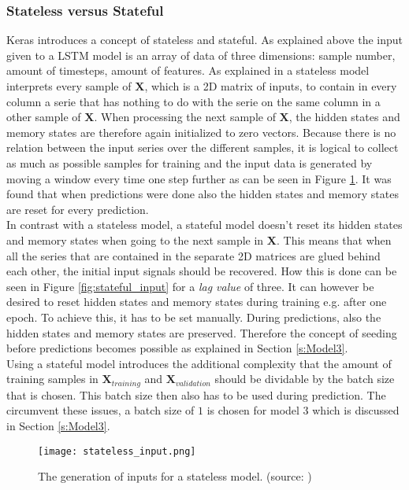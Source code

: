 \subsubsection{Stateless versus Stateful}
Keras introduces a concept of stateless and stateful. As explained above the input given to a LSTM model is an array of data of three dimensions: sample number, amount of timesteps, amount of features. As explained in \cite{FneishMo} a stateless model interprets every sample of $ \bm{X} $, which is a 2D matrix of inputs, to contain in every column a serie that has nothing to do with the serie on the same column in a other sample of $ \bm{X} $. When processing the next sample of $ \bm{X} $, the hidden states and memory states are therefore again initialized to zero vectors. Because there is no relation between the input series over the different samples, it is logical to collect as much as possible samples for training and the input data is generated by moving a window every time one step further as can be seen in Figure \ref{fig:stateless_input}. It was found that when predictions were done also the hidden states and memory states are reset for every prediction.\\

In contrast with a stateless model, a stateful model doesn't reset its hidden states and memory states when going to the next sample in $ \bm{X} $. This means that when all the series that are contained in the separate 2D matrices are glued behind each other, the initial input signals should be recovered. How this is done can be seen in Figure \ref{fig:stateful_input} for a \textit{lag value} of three. It can however be desired to reset hidden states and memory states during training e.g. after one epoch. To achieve this, it has to be set manually. During predictions, also the hidden states and memory states are preserved. Therefore the concept of seeding before predictions becomes possible as explained in Section \ref{s:Model3}.\\

Using a stateful model introduces the additional complexity that the amount of training samples in $ \bm{X}_{training} $ and $ \bm{X}_{validation} $ should be dividable by the batch size that is chosen. This batch size then also has to be used during prediction. The circumvent these issues, a batch size of $ 1 $ is chosen for model $ 3 $ which is discussed in Section \ref{s:Model3}.\\


\begin{figure}[h]
	\centering
	\texttt{[image: stateless\_input.png]}
	\caption{The generation of inputs for a stateless model. (source: \cite{FneishMo})}
	\label{fig:stateless_input}
\end{figure}

